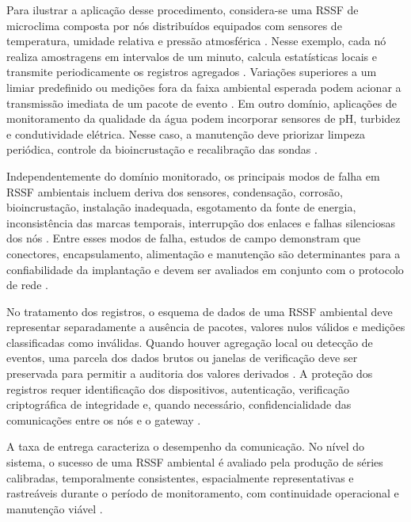 Para ilustrar a aplicação desse procedimento, considera-se uma \ac{RSSF} de microclima composta por nós distribuídos equipados com sensores de temperatura, umidade relativa e pressão atmosférica \cite{10.1145/570738.570751}.
Nesse exemplo, cada nó realiza amostragens em intervalos de um minuto, calcula estatísticas locais e transmite periodicamente os registros agregados \cite{5597912,ANASTASI2009537}.
Variações superiores a um limiar predefinido ou medições fora da faixa ambiental esperada podem acionar a transmissão imediata de um pacote de evento \cite{5597912,ANASTASI2009537}.
Em outro domínio, aplicações de monitoramento da qualidade da água podem incorporar sensores de pH, turbidez e condutividade elétrica. Nesse caso, a manutenção deve priorizar limpeza periódica, controle da bioincrustação e recalibração das sondas \cite{10.1145/3005719}.

Independentemente do domínio monitorado, os principais modos de falha em RSSF ambientais incluem deriva dos sensores, condensação, corrosão, bioincrustação, instalação inadequada, esgotamento da fonte de energia, inconsistência das marcas temporais, interrupção dos enlaces e falhas silenciosas dos nós \cite{YICK20082292,5597912,10.1145/1031495.1031521,10.1145/3005719,atmos10090506,KANG2022151769}.
Entre esses modos de falha, estudos de campo demonstram que conectores, encapsulamento, alimentação e manutenção são determinantes para a confiabilidade da implantação e devem ser avaliados em conjunto com o protocolo de rede \cite{5597912,10.1145/1031495.1031521,10.1145/1134680.1134685}.

No tratamento dos registros, o esquema de dados de uma RSSF ambiental deve representar separadamente a ausência de pacotes, valores nulos válidos e medições classificadas como inválidas. Quando houver agregação local ou detecção de eventos, uma parcela dos dados brutos ou janelas de verificação deve ser preservada para permitir a auditoria dos valores derivados \cite{5597912,10.1145/1031495.1031521,ANASTASI2009537}.
A proteção dos registros requer identificação dos dispositivos, autenticação, verificação criptográfica de integridade e, quando necessário, confidencialidade das comunicações entre os nós e o gateway \cite{YICK20082292,s23208440}.

A taxa de entrega caracteriza o desempenho da comunicação. No nível do sistema, o sucesso de uma RSSF ambiental é avaliado pela produção de séries calibradas, temporalmente consistentes, espacialmente representativas e rastreáveis durante o período de monitoramento, com continuidade operacional e manutenção viável \cite{YICK20082292,HART2006177,5597912,10.1145/1031495.1031521,KANG2022151769}.